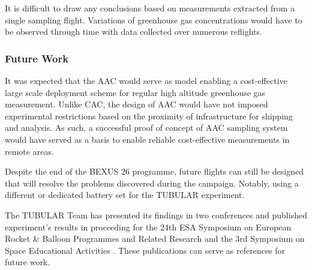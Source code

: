 It is difficult to draw any conclusions based on measurements extracted from a single sampling flight. Variations of greenhouse gas concentrations would have to be observed through time with data collected over numerous reflights.

\subsubsection{Future Work}\label{sec:futurework}

It was expected that the AAC would serve as model enabling a cost-effective large scale deployment scheme for regular high altitude greenhouse gas measurement. Unlike CAC, the design of AAC would have not imposed experimental restrictions based on the proximity of infrastructure for shipping and analysis. As such, a successful proof of concept of AAC sampling system would have served as a basis to enable reliable cost-effective measurements in remote areas.

Despite the end of the BEXUS 26 programme, future flights can still be designed that will resolve the problems discovered during the campaign. Notably, using a different or dedicated battery set for the TUBULAR experiment.

The TUBULAR Team has presented its findings in two conferences and published experiment's results in proceeding for the 24th ESA Symposium on European Rocket & Balloon Programmes and Related Research \cite{esapac} and the 3rd Symposium on Space Educational Activities \cite{labreche2020}. These publications can serve as references for future work.
